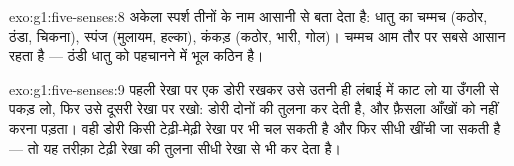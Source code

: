 \begin{solution}{exo:g1:five-senses:8}
अकेला स्पर्श तीनों के नाम आसानी से बता देता है: धातु का चम्मच (कठोर,
ठंडा, चिकना), स्पंज (मुलायम, हल्का), कंकड़ (कठोर, भारी, गोल)। चम्मच
आम तौर पर सबसे आसान रहता है --- ठंडी धातु को पहचानने में भूल कठिन है।
\end{solution}

\begin{solution}{exo:g1:five-senses:9}
पहली रेखा पर एक डोरी रखकर उसे उतनी ही लंबाई में काट लो या उँगली से
पकड़ लो, फिर उसे दूसरी रेखा पर रखो: डोरी दोनों की तुलना कर देती है,
और फ़ैसला आँखों को नहीं करना पड़ता। वही डोरी किसी टेढ़ी-मेढ़ी रेखा पर
भी चल सकती है और फिर सीधी खींची जा सकती है --- तो यह तरीक़ा टेढ़ी रेखा
की तुलना सीधी रेखा से भी कर देता है।
\end{solution}
